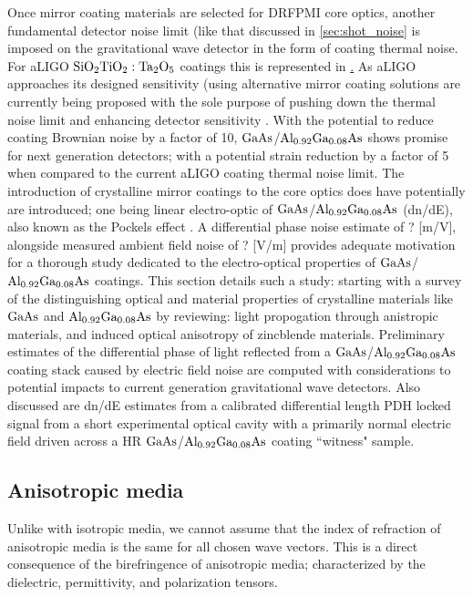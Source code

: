 
Once mirror coating materials are selected for DRFPMI core optics, another fundamental detector noise limit (like that discussed in \ref{sec:shot_noise} is imposed on the gravitational wave detector in the form of coating thermal noise. For aLIGO $\mathrm{SiO_2}\mathrm{TiO_2:Ta_2O_5}$ coatings this is represented in \hyperref[sec:ligo_noise]. As aLIGO approaches its designed sensitivity (using alternative mirror coating solutions are currently being proposed with the sole purpose of pushing down the thermal noise limit and enhancing detector sensitivity \cite{?}. With the potential to reduce coating Brownian noise by a factor of 10, $\mathrm{GaAs}$/$\mathrm{Al_{0.92}Ga_{0.08}As}$ shows promise for next generation detectors; with a potential strain reduction by a factor of 5 \cite{Cole:2013} when compared to the current aLIGO coating thermal noise limit. The introduction of crystalline mirror coatings to the core optics does have potentially are introduced; one being linear electro-optic of $\mathrm{GaAs}$/$\mathrm{Al_{0.92}Ga_{0.08}As}$ (dn/dE), also known as the Pockels effect \cite{abernathy_poster}. A differential phase noise estimate of ? [m/V], alongside measured ambient field noise of ? [V/m] provides adequate motivation for a thorough study dedicated to the electro-optical properties of $\mathrm{GaAs}$/$\mathrm{Al_{0.92}Ga_{0.08}As}$ coatings. This section details such a study: starting with a survey of the distinguishing optical and material properties of crystalline materials like $\mathrm{GaAs}$ and $\mathrm{Al_{0.92}Ga_{0.08}As}$ by reviewing: light propogation through anistropic materials, and induced optical anisotropy of zincblende materials. Preliminary estimates of the differential phase of light reflected from a $\mathrm{GaAs}$/$\mathrm{Al_{0.92}Ga_{0.08}As}$ coating stack caused by electric field noise are computed with considerations to potential impacts to current generation gravitational wave detectors. Also discussed are dn/dE estimates from a calibrated differential length PDH locked signal from a short experimental optical cavity with a primarily normal electric field driven across a HR $\mathrm{GaAs}$/$\mathrm{Al_{0.92}Ga_{0.08}As}$ coating ``witness" sample.

\subsection{Anisotropic media}
Unlike with isotropic media, we cannot assume that the index of refraction of anisotropic media is the same for all chosen wave vectors. This is a direct consequence of the birefringence of anisotropic media; characterized by the dielectric, permittivity, and polarization tensors.

